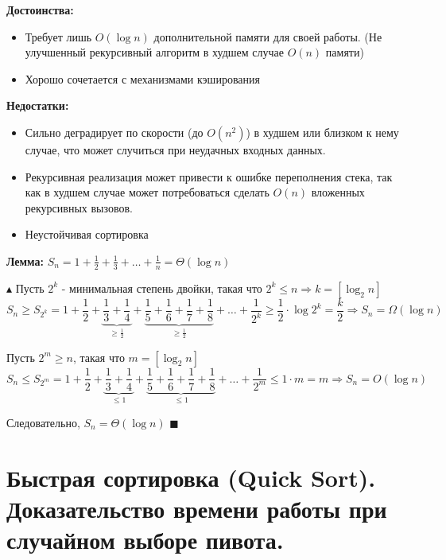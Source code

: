 \textbf{Достоинства: } 
\begin{itemize}
    \item Требует лишь $O(\log n)$ дополнительной памяти для своей работы. (Не улучшенный рекурсивный алгоритм в худшем случае $O(n)$ памяти)
    \item Хорошо сочетается с механизмами кэширования
\end{itemize}
\textbf{Недостатки: } 
\begin{itemize}
    \item Сильно деградирует по скорости (до $O(n^2)$) в худшем или близком к нему случае, что может случиться при неудачных входных данных.
    \item Рекурсивная реализация может привести к ошибке переполнения стека, так как в худшем случае может потребоваться сделать $O(n)$ вложенных рекурсивных вызовов.
    \item Неустойчивая сортировка
\end{itemize}

\par \textbf{Лемма: } $S_n = 1+\frac{1}{2}+\frac{1}{3}+\ldots+\frac{1}{n}=\Theta(\log{n})$

$\blacktriangle$ Пусть $2^k$ - минимальная степень двойки, такая что $2^k\leq n \Rightarrow k = [\log_2{n}]$ 
$$ S_n \geq S_{2^k} = 1 + \frac{1}{2} + \underbrace{\frac{1}{3}+\frac{1}{4}}_{\geq \frac{1}{2}}+ \underbrace{\frac{1}{5}+\frac{1}{6}+ \frac{1}{7} + \frac{1}{8}}_{\geq \frac{1}{2}} + \ldots + \frac{1}{2^k}\geq \frac{1}{2}\cdot \log{2^k} = \frac{k}{2} \Rightarrow S_n=\Omega(\log{n})$$

Пусть $2^m \geq n$, такая что $m = [\log_2{n}]$
$$ S_n \leq S_{2^m} = 1 + \frac{1}{2} + \underbrace{\frac{1}{3}+\frac{1}{4}}_{\leq 1}+ \underbrace{\frac{1}{5}+\frac{1}{6}+ \frac{1}{7} + \frac{1}{8}}_{\leq 1} + \ldots + \frac{1}{2^m}\leq 1\cdot m = m \Rightarrow S_n=O(\log{n})$$

Следовательно, $S_n=\Theta(\log{n})$ \quad $\blacksquare$

\section{Быстрая сортировка (Quick Sort). Доказательство времени работы при случайном выборе пивота. }

